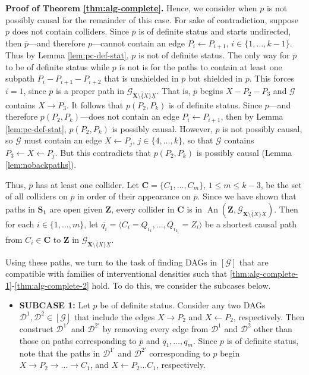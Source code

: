 \documentclass[11pt]{article}
\DeclareMathOperator{\An}{An}
\newcommand{\mb}[1]{\mathbf{#1}}
\newcommand{\g}[1][G]{\mathcal{#1}}
\newenvironment{proofofnoqed}[1][]{\noindent \textbf{Proof of #1.}}{}
\begin{document}
\begin{proofofnoqed}[Theorem \ref{thm:alg-complete}]
    Hence, we consider when $p$ is not possibly causal for the remainder of this case. For sake of contradiction, suppose $\overline{p}$ does not contain colliders. Since $\overline{p}$ is of definite status and starts undirected, then $\overline{p}$---and therefore $p$---cannot contain an edge $P_i \gets P_{i+1}$, $i \in \{1, \dots, k-1\}$. Thus by Lemma \ref{lem:pc-def-stat}, $p$ is not of definite status. The only way for $\overline{p}$ to be of definite status while $p$ is not is for the paths to contain at least one subpath $P_i - P_{i+1} - P_{i+2}$ that is unshielded in $\overline{p}$ but shielded in $p$. This forces $i=1$, since $\overline{p}$ is a proper path in $\g_{\overline{\mb{X} \setminus \{X\}} \underline{X}}$. That is, $\overline{p}$ begins $X - P_2 - P_3$ and $\g$ contains $X \to P_3$. It follows that $p(P_2, P_k)$ is of definite status. Since $p$---and therefore $p(P_2, P_k)$---does not contain an edge $P_i \gets P_{i+1}$, then by Lemma \ref{lem:pc-def-stat}, $p(P_2, P_k)$ is possibly causal. However, $p$ is not possibly causal, so $\g$ must contain an edge $X \gets P_j$, $j \in \{4, \dots, k\}$, so that $\g$ contains $P_3 \gets X \gets P_j$. But this contradicts that $p(P_2, P_k)$ is possibly causal (Lemma \ref{lem:nobackpaths}).

    Thus, $\overline{p}$ has at least one collider. Let $\mb{C} = \{C_1, \dots, C_m \}$, $1 \le m \le k-3$, be the set of all colliders on $\overline{p}$ in order of their appearance on $\overline{p}$. Since we have shown that paths in $\mb{S_1}$ are open given $\mb{Z}$, every collider in $\mb{C}$ is in $\An(\mb{Z},\g_{\overline{\mb{X} \setminus \{X\}} \underline{X}})$. Then for each $i \in \{1, \dots, m\}$, let $\overline{q_i} = \langle C_i = Q_{i_1}, \dots, Q_{i_{k_i}}=Z_i \rangle$ be a shortest causal path from $C_i \in \mb{C}$ to $\mb{Z}$ in $\g_{\overline{\mb{X} \setminus \{X\}} \underline{X}}$.
    
    Using these paths, we turn to the task of finding DAGs in $[\g]$ that are compatible with families of interventional densities such that \eqref{thm:alg-complete-1}-\eqref{thm:alg-complete-2} hold. To do this, we consider the subcases below.
    \begin{itemize}
        \item \textbf{SUBCASE 1:}
        Let $p$ be of definite status. Consider any two DAGs $\g[D]^1, \g[D]^2 \in [\g]$ that include the edges $X \to P_2$ and $X \gets P_2$, respectively. Then construct $\g[D]^{1'}$ and $\g[D]^{2'}$ by removing every edge from $\g[D]^1$ and $\g[D]^2$ other than those on paths corresponding to $\overline{p}$ and $\overline{q_1}, \dots, \overline{q_m}$. Since $p$ is of definite status, note that the paths in $\g[D]^{1'}$ and $\g[D]^{2'}$ corresponding to $p$ begin $X \to P_2 \to \dots \to C_1$, and $X \gets P_2 \dots C_1$, respectively.


\end{itemize}
\end{proofofnoqed}
\end{document}
